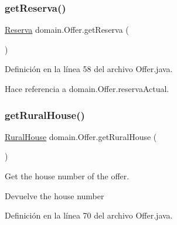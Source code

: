 \subsubsection{\texorpdfstring{getReserva()}{getReserva()}}
{\footnotesize\ttfamily \mbox{\hyperlink{classdomain_1_1_reserva}{Reserva}} domain.\+Offer.\+get\+Reserva (\begin{DoxyParamCaption}{ }\end{DoxyParamCaption})}



Definición en la línea 58 del archivo Offer.\+java.


\begin{DoxyCode}{0}

\end{DoxyCode}


Hace referencia a domain.\+Offer.\+reserva\+Actual.

\mbox{\label{classdomain_1_1_offer_a3804f5f9ad3a3bf380e55389ccfa9dba}} 
\subsubsection{\texorpdfstring{getRuralHouse()}{getRuralHouse()}}
{\footnotesize\ttfamily \mbox{\hyperlink{classdomain_1_1_rural_house}{Rural\+House}} domain.\+Offer.\+get\+Rural\+House (\begin{DoxyParamCaption}{ }\end{DoxyParamCaption})}



Get the house number of the offer. 

\begin{DoxyReturn}{Devuelve}
the house number 
\end{DoxyReturn}


Definición en la línea 70 del archivo Offer.\+java.


\begin{DoxyCode}{0}

\end{DoxyCode}


